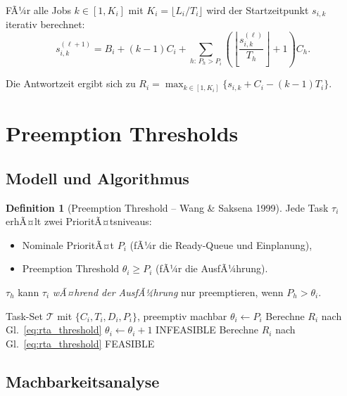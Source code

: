 ﻿\documentclass[a4paper,12pt]{report}
\theoremstyle{definition}
\newtheorem{definition}{Definition}[chapter]
\begin{document}
FÃ¼r alle Jobs $k \in [1, K_i]$ mit $K_i = \lfloor L_i/T_i \rfloor$ wird der Startzeitpunkt
$s_{i,k}$ iterativ berechnet:
\[
	s_{i,k}^{(\ell+1)} = B_i + (k-1)C_i + \sum_{h:\,P_h > P_i} \left(\left\lfloor \frac{s_{i,k}^{(\ell)}}{T_h} \right\rfloor + 1\right) C_h.
\]

Die Antwortzeit ergibt sich zu $R_i = \max_{k \in [1,K_i]}\{s_{i,k} + C_i - (k-1)T_i\}$.

\section{Preemption Thresholds}

\subsection{Modell und Algorithmus}

\begin{definition}[Preemption Threshold -- Wang \& Saksena 1999]
	Jede Task $\tau_i$ erhÃ¤lt zwei PrioritÃ¤tsniveaus:
	\begin{itemize}
		\item Nominale PrioritÃ¤t $P_i$ (fÃ¼r die Ready-Queue und Einplanung),
		\item Preemption Threshold $\theta_i \geq P_i$ (fÃ¼r die AusfÃ¼hrung).
	\end{itemize}
	$\tau_h$ kann $\tau_i$ \emph{wÃ¤hrend der AusfÃ¼hrung} nur preemptieren, wenn
	$P_h > \theta_i$.
\end{definition}

\begin{algorithm}[H]
	\caption{Assign Minimum Preemption Thresholds (Wang \& Saksena)}
	\begin{algorithmic}[1]
		\Require Task-Set $\mathcal{T}$ mit $\{C_i, T_i, D_i, P_i\}$, preemptiv machbar
		 
		\State $\theta_i \leftarrow P_i$
		\State Berechne $R_i$ nach Gl.~\eqref{eq:rta_threshold}
		\State $\theta_i \leftarrow \theta_i + 1$
		 \Return INFEASIBLE \EndIf
		\State Berechne $R_i$ nach Gl.~\eqref{eq:rta_threshold}
		\EndWhile
		\EndFor
		\State \Return FEASIBLE
	\end{algorithmic}
\end{algorithm}

\subsection{Machbarkeitsanalyse}
\end{document}
